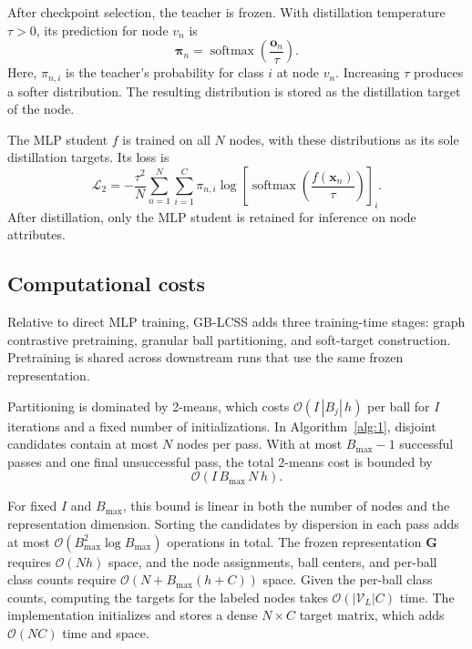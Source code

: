 \documentclass[times,review,10pt]{elsarticle}
\theoremstyle{definition}
\theoremstyle{plain}
\begin{document}
After checkpoint selection, the teacher is frozen. With distillation temperature \(\tau>0\), its prediction for node \(v_n\) is
\begin{equation}\label{eq:20}
\boldsymbol\pi_n=\operatorname{softmax}\left(\frac{\mathbf o_n}{\tau}\right).
\end{equation}
Here, \(\pi_{n,i}\) is the teacher's probability for class \(i\) at node \(v_n\). Increasing \(\tau\) produces a softer distribution. The resulting distribution is stored as the distillation target of the node.

The MLP student \(f\) is trained on all \(N\) nodes, with these distributions as its sole distillation targets. Its loss is
\begin{equation}\label{eq:21}
\mathcal L_2=-\frac{\tau^2}{N}\sum_{n=1}^{N}\sum_{i=1}^C\pi_{n,i}
\log\left[\operatorname{softmax}\left(\frac{f(\mathbf x_n)}{\tau}\right)\right]_i.
\end{equation}
After distillation, only the MLP student is retained for inference on node attributes.

\subsection{Computational costs}\label{sec:3.6}

Relative to direct MLP training, GB-LCSS adds three training-time stages: graph contrastive pretraining, granular ball partitioning, and soft-target construction. Pretraining is shared across downstream runs that use the same frozen representation.


Partitioning is dominated by 2-means, which costs \(\mathcal{O}(I\,|B_j|\,h)\) per ball for \(I\) iterations and a fixed number of initializations. In Algorithm~\ref{alg:1}, disjoint candidates contain at most \(N\) nodes per pass. With at most \(B_{\max}-1\) successful passes and one final unsuccessful pass, the total 2-means cost is bounded by
\begin{equation}\label{eq:22}
\mathcal{O}(I\,B_{\max}\,N\,h).
\end{equation}

For fixed \(I\) and \(B_{\max}\), this bound is linear in both the number of nodes and the representation dimension. Sorting the candidates by dispersion in each pass adds at most \(\mathcal{O}(B_{\max}^{2}\log B_{\max})\) operations in total. The frozen representation \(\mathbf G\) requires \(\mathcal{O}(Nh)\) space, and the node assignments, ball centers, and per-ball class counts require \(\mathcal{O}(N + B_{\max}(h + C))\) space. Given the per-ball class counts, computing the targets for the labeled nodes takes \(\mathcal{O}(|\mathcal{V}_{L}|C)\) time. The implementation initializes and stores a dense \(N \times C\) target matrix, which adds \(\mathcal{O}(NC)\) time and space.
\end{document}
